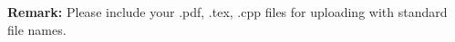 \documentclass[12pt,a4paper]{article}
\theoremstyle{definition}
\begin{document}
\begin{enumerate}
\begin{enumerate}
    \end{enumerate}	
\end{enumerate}

	  

\textbf{Remark:} Please include your .pdf, .tex, .cpp files for uploading with standard file names.
\newpage


\end{document}
